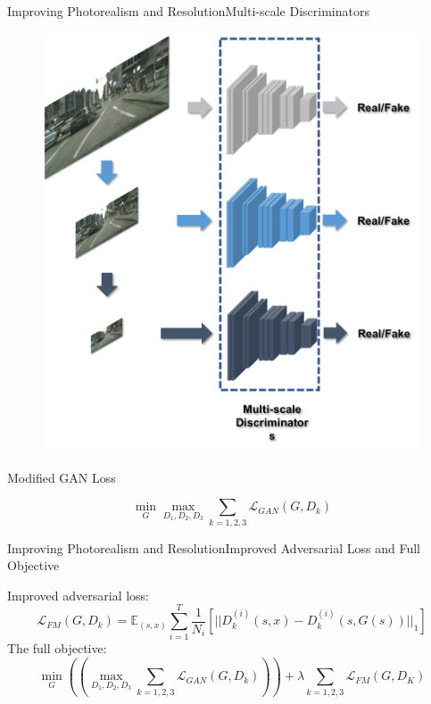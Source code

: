\documentclass{beamer}
\begin{document}
\begin{frame}{Improving Photorealism and Resolution}{Multi-scale  Discriminators}
	\begin{figure}
	\centering
	\includegraphics[height=0.6\textheight]{images/multi-scale}
\end{figure}
%
%
\begin{beamerboxesrounded}[upper=uppercol,lower=lowercol,shadow=false]{Modified GAN Loss}

\begin{equation}
\min_G\max_{D_1,D_2,D_3}\sum_{k=1,2,3} \mathcal{L}_{GAN}(G,D_k)
\end{equation}
\end{beamerboxesrounded}

\end{frame}

\begin{frame}{Improving Photorealism and Resolution}{Improved Adversarial Loss and Full Objective}

	Improved adversarial loss:
	\begin{equation}
	\mathcal{L}_{FM}(G,D_k)=\mathbb{E}_{(s,x)} \sum_{i=1}^T \frac{1}{N_i}[||D_k^{(i)}(s,x)-D_{k}^{(i)}(s,G(s))||_1]
	\end{equation}
	The full objective:
	\begin{equation}
\min_G ((\max_{D_1,D_2,D_3}\sum_{k=1,2,3} \mathcal{L}_{GAN}(G,D_k)))+\lambda \sum_{k=1,2,3}\mathcal{L}_{FM}(G,D_K)
	\end{equation}
\end{frame}
\end{document}
